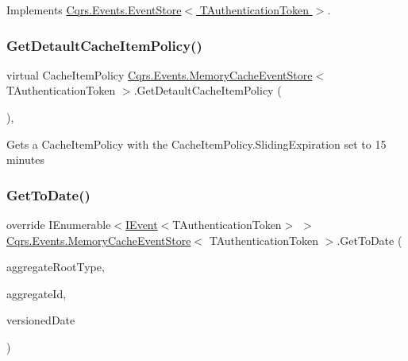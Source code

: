 Implements \hyperlink{classCqrs_1_1Events_1_1EventStore_add415731fcea6a9367e1031c4608c922_add415731fcea6a9367e1031c4608c922}{Cqrs.\+Events.\+Event\+Store$<$ T\+Authentication\+Token $>$}.

\mbox{\label{classCqrs_1_1Events_1_1MemoryCacheEventStore_a2dddf1e1c4c737ad393655ee990953b3_a2dddf1e1c4c737ad393655ee990953b3}} 
\subsubsection{\texorpdfstring{Get\+Detault\+Cache\+Item\+Policy()}{GetDetaultCacheItemPolicy()}}
{\footnotesize\ttfamily virtual Cache\+Item\+Policy \hyperlink{classCqrs_1_1Events_1_1MemoryCacheEventStore}{Cqrs.\+Events.\+Memory\+Cache\+Event\+Store}$<$ T\+Authentication\+Token $>$.Get\+Detault\+Cache\+Item\+Policy (\begin{DoxyParamCaption}{ }\end{DoxyParamCaption})\hspace{0.3cm}{\ttfamily [protected]}, {\ttfamily [virtual]}}



Get\textquotesingle{}s a Cache\+Item\+Policy with the Cache\+Item\+Policy.\+Sliding\+Expiration set to 15 minutes 

\mbox{\label{classCqrs_1_1Events_1_1MemoryCacheEventStore_a2913ce1088ce65a88046763a8f1a46d9_a2913ce1088ce65a88046763a8f1a46d9}} 
\subsubsection{\texorpdfstring{Get\+To\+Date()}{GetToDate()}}
{\footnotesize\ttfamily override I\+Enumerable$<$\hyperlink{interfaceCqrs_1_1Events_1_1IEvent}{I\+Event}$<$T\+Authentication\+Token$>$ $>$ \hyperlink{classCqrs_1_1Events_1_1MemoryCacheEventStore}{Cqrs.\+Events.\+Memory\+Cache\+Event\+Store}$<$ T\+Authentication\+Token $>$.Get\+To\+Date (\begin{DoxyParamCaption}\item[{Type}]{aggregate\+Root\+Type,  }\item[{Guid}]{aggregate\+Id,  }\item[{Date\+Time}]{versioned\+Date }\end{DoxyParamCaption})\hspace{0.3cm}{\ttfamily [virtual]}}



